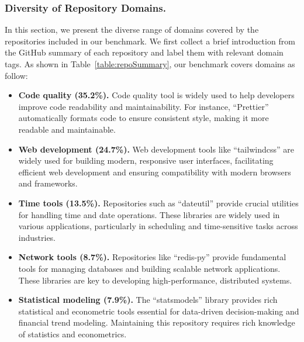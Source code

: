 \subsubsection{Diversity of Repository Domains.} In this section, we present the diverse range of domains covered by the repositories included in our benchmark. We first collect a brief introduction from the GitHub summary of each repository and label them with relevant domain tags. As shown in Table~\ref{table:repoSummary}, our benchmark covers domains as follow:

\begin{itemize}[left=10pt]

\item \textbf{Code quality (35.2\%).} Code quality tool is widely used to help developers improve code readability and maintainability. For instance, ``Prettier'' automatically formats code to ensure consistent style, making it more readable and maintainable.

\item \textbf{Web development (24.7\%).}  
Web development tools like ``tailwindcss'' are widely used for building modern, responsive user interfaces, facilitating efficient web development and ensuring compatibility with modern browsers and frameworks.

\item \textbf{Time tools (13.5\%).}  
Repositories such as ``dateutil'' provide crucial utilities for handling time and date operations. These libraries are widely used in various applications, particularly in scheduling and time-sensitive tasks across industries.

\item \textbf{Network tools (8.7\%).}  
Repositories like ``redis-py'' provide fundamental tools for managing databases and building scalable network applications. These libraries are key to developing high-performance, distributed systems.

\item \textbf{Statistical modeling (7.9\%).}  The ``statsmodels'' library provides rich statistical and econometric tools essential for data-driven decision-making and financial trend modeling. Maintaining this repository requires rich knowledge of statistics and econometrics.



\end{itemize}
